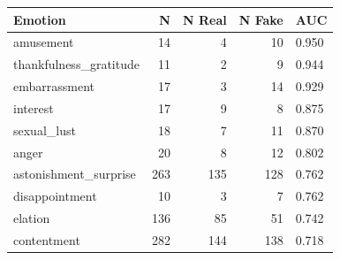 \begin{tabular}{lrrrl}
\toprule
Emotion & N & N Real & N Fake & AUC \\
\midrule
amusement & 14 & 4 & 10 & 0.950 \\
thankfulness\_gratitude & 11 & 2 & 9 & 0.944 \\
embarrassment & 17 & 3 & 14 & 0.929 \\
interest & 17 & 9 & 8 & 0.875 \\
sexual\_lust & 18 & 7 & 11 & 0.870 \\
anger & 20 & 8 & 12 & 0.802 \\
astonishment\_surprise & 263 & 135 & 128 & 0.762 \\
disappointment & 10 & 3 & 7 & 0.762 \\
elation & 136 & 85 & 51 & 0.742 \\
contentment & 282 & 144 & 138 & 0.718 \\
\bottomrule
\end{tabular}
